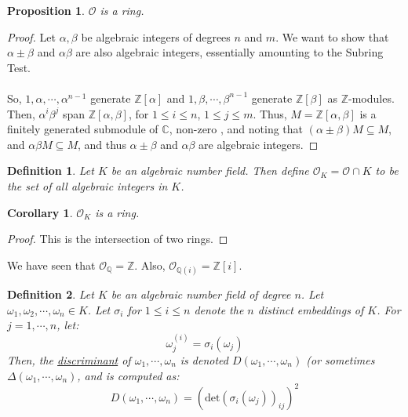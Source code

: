\documentclass{article}
\newcommand{\C}{\mathbb{C}}
\newcommand{\Q}{\mathbb{Q}}
\newcommand{\Z}{\mathbb{Z}}
\newtheorem{cor}{Corollary}
\newtheorem{proposition}{Proposition}
\newtheorem{definition}{Definition}
\begin{document}
\begin{proposition}
$\mathcal{O}$ is a ring.
\end{proposition}
\begin{proof}
Let $\alpha,\beta$ be algebraic integers of degrees $n$ and $m$. We want to show that $\alpha\pm \beta$ and $\alpha\beta$ are also algebraic integers, essentially amounting to the Subring Test. \\
\\
So, $1,\alpha,\cdots, \alpha^{n-1}$ generate $\Z[\alpha]$ and $1,\beta,\cdots, \beta^{n-1}$ generate $\Z[\beta]$ as $\Z$-modules. Then, $\alpha^i\beta^j$ span $\Z[\alpha,\beta]$, for $1\leq i\leq n$, $1\leq j\leq m$. Thus, $M=\Z[\alpha,\beta]$ is a finitely generated submodule of $\C$, non-zero , and noting that $(\alpha\pm \beta)M\subseteq M$, and $\alpha\beta M\subseteq M$, and thus $\alpha\pm \beta$ and $\alpha\beta$ are algebraic integers.
\end{proof}
\begin{definition}
Let $K$ be an algebraic number field. Then define $\mathcal{O}_K=\mathcal{O}\cap K$ to be the set of all algebraic integers in $K$.
\end{definition}
\begin{cor}
$\mathcal{O}_K$ is a ring.
\end{cor}
\begin{proof}
This is the intersection of two rings.
\end{proof}
\noindent We have seen that $\mathcal{O}_\Q = \Z$. Also, $\mathcal{O}_{\Q(i)}=\Z[i]$.
\begin{definition}
Let $K$ be an algebraic number field of degree $n$. Let $\omega_1,\omega_2,\cdots, \omega_n\in K$. Let $\sigma_i$ for $1\leq i\leq n$ denote the $n$ distinct embeddings of $K$. For $j=1,\cdots, n$, let:
$$\omega_j^{(i)}=\sigma_i(\omega_j)$$
Then, the \underline{discriminant} of $\omega_1,\cdots, \omega_n$ is denoted $D(\omega_1,\cdots, \omega_n)$ (or sometimes $\Delta(\omega_1,\cdots, \omega_n)$, and is computed as:
$$D(\omega_1,\cdots, \omega_n)=(\text{det}(\sigma_i(\omega_j))_{ij})^2$$
\end{definition}
\end{document}
